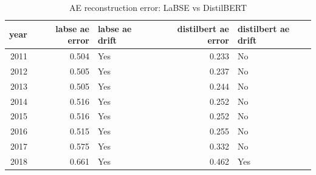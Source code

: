 \begin{table}[ht]
\centering
\caption{AE reconstruction error: LaBSE vs DistilBERT}
\label{tab:labse_vs_distilbert_ae}
\begin{tabular}{rrlrl}
\toprule
year & labse ae error & labse ae drift & distilbert ae error & distilbert ae drift \\
\midrule
2011 & 0.504 & Yes & 0.233 & No \\
2012 & 0.505 & Yes & 0.237 & No \\
2013 & 0.505 & Yes & 0.244 & No \\
2014 & 0.516 & Yes & 0.252 & No \\
2015 & 0.516 & Yes & 0.252 & No \\
2016 & 0.515 & Yes & 0.255 & No \\
2017 & 0.575 & Yes & 0.332 & No \\
2018 & 0.661 & Yes & 0.462 & Yes \\
\bottomrule
\end{tabular}
\end{table}
